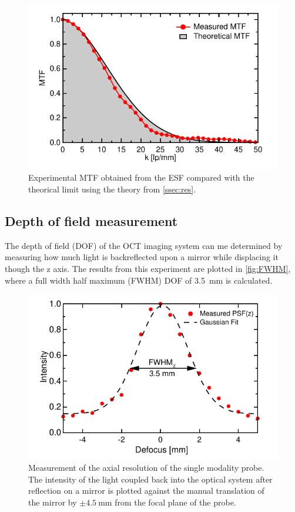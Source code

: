 \documentclass[10pt]{iopart}
\begin{document}
\begin{figure}[h!]\centering \includegraphics[width=\columnwidth]{figures/confRes.pdf}
      \caption{Experimental MTF obtained from the ESF compared with the theorical limit using the theory from \autoref{ssec:res}.}
      \label{fig:MTF}
\end{figure}

\subsection{Depth of field measurement}
The depth of field (DOF) of the OCT imaging system can me determined by measuring how much light is backreflected upon a mirror while displacing it though the z axis. The results from this experiment are plotted in \autoref{fig:FWHM}, where a full width half maximum (FWHM) DOF of \SI{3.5}{\milli\meter} is calculated. 

\begin{figure}[h!]\centering \includegraphics[width=\columnwidth]{figures/PSFz.pdf}
      \caption{Measurement of the axial resolution of the single modality probe. The intensity of the light coupled back into the optical system after reflection on a mirror is plotted against the manual translation of the mirror by $\pm \SI{4.5}{\milli\meter}$ from the focal plane of the probe. }
      \label{fig:FWHM}
\end{figure}
\end{document}

